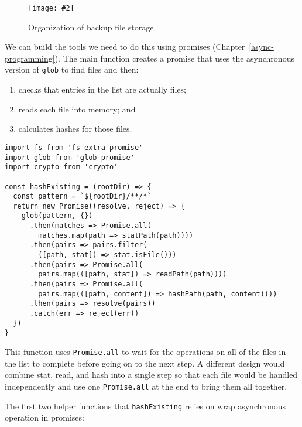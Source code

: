 \documentclass[krantzl]{krantz}
\newcommand{\figpdf}[4]{\begin{figure}%
\centering%
\texttt{[image: \#2]}%
\caption{#3}%
\label{#1}%
\end{figure}}
\newcommand{\chapref}[1]{Chapter~\ref{#1}}
\begin{document}
\figpdf{file-backup-storage}{./file-backup/storage.pdf}{Organization of backup file storage.}{0.6}


We can build the tools we need to do this using promises (\chapref{async-programming}).
The main function creates a promise that uses the asynchronous version of \texttt{glob} to find files
and then:

\begin{enumerate}

\item 

checks that entries in the list are actually files;



\item 

reads each file into memory; and



\item 

calculates hashes for those files.



\end{enumerate}


\begin{lstlisting}[frame=single,frameround=tttt]
import fs from 'fs-extra-promise'
import glob from 'glob-promise'
import crypto from 'crypto'

const hashExisting = (rootDir) => {
  const pattern = `${rootDir}/**/*`
  return new Promise((resolve, reject) => {
    glob(pattern, {})
      .then(matches => Promise.all(
        matches.map(path => statPath(path))))
      .then(pairs => pairs.filter(
        ([path, stat]) => stat.isFile()))
      .then(pairs => Promise.all(
        pairs.map(([path, stat]) => readPath(path))))
      .then(pairs => Promise.all(
        pairs.map(([path, content]) => hashPath(path, content))))
      .then(pairs => resolve(pairs))
      .catch(err => reject(err))
  })
}
\end{lstlisting}



\noindent This function uses \texttt{Promise.all}
to wait for the operations on all of the files in the list to complete
before going on to the next step.
A different design would combine stat, read, and hash into a single step
so that each file would be handled independently
and use one \texttt{Promise.all} at the end to bring them all together.


The first two helper functions that \texttt{hashExisting} relies on
wrap asynchronous operation in promises:
\end{document}
